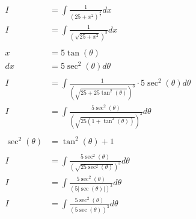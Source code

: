 \documentclass[12pt]{article}
\begin{document}
\begin{align}
    I                                                & = \int \frac{1}{(25+x^2)^{\frac{3}{2}}} dx                                               \\
    I                                                & = \int \frac{1}{\left(\sqrt{25+x^2}\right)^3} dx                                         \\
    \nonumber                                                                                                                                   \\
    x                                                & = 5\tan(\theta)                                                                          \\
    dx                                               & = 5\sec^2(\theta) d\theta                                                                \\
    \nonumber                                                                                                                                   \\
    I                                                & = \int \frac{1}{\left(\sqrt{25+25\tan^2(\theta)}\right)^3} \cdot 5\sec^2(\theta) d\theta \\
    I                                                & = \int \frac{5\sec^2(\theta)}{\left(\sqrt{25(1+\tan^2(\theta))}\right)^3} d\theta        \\
    \nonumber                                                                                                                                   \\
    \sec^2(\theta)                                   & = \tan^2(\theta) + 1                                                                     \\
    \nonumber                                                                                                                                   \\
    I                                                & = \int \frac{5\sec^2(\theta)}{\left(\sqrt{25\sec^2(\theta)}\right)^3} d\theta            \\
    I                                                & = \int \frac{5\sec^2(\theta)}{(5|\sec(\theta)|)^3} d\theta                               \\
    I                                                & = \int \frac{5\sec^2(\theta)}{(5\sec(\theta))^3} d\theta                                 \\

\end{align}
\end{document}
